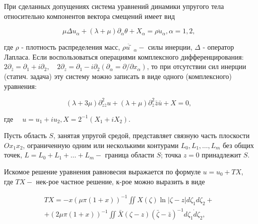 \documentclass[10pt]{article}
\begin{document}
При сделанных допущениях система уравнений динамики упругого тела относительно компонентов вектора смещений имеет вид



\[

\mu \Delta u_{\alpha}+(\lambda+\mu) \partial_{\alpha} \theta+X_{\alpha}=\rho \ddot{u}_{\alpha}, \alpha=1,2,

\]



где $\rho$ - плотность распределения масс, $\rho \ddot{u ̈}_{\alpha}-$ силы инерции, $\Delta$ - оператор Лапласа. Если воспользоваться операциями комплексного дифференцирования: $2 \partial_{\bar{z}}=\partial_{1}+i \partial_{2}, \quad 2 \partial_{z}=\partial_{1}-i \partial_{2}\left(\partial_{\alpha}=\partial / \partial x_{\alpha}\right)$, то при отсутствии сил инерции (статич. задача) эту систему можно записать в виде одного (комплексного) уравнения:



\[

(\lambda+3 \mu) \partial_{z \bar{z}}^{2} u+(\lambda+\mu) \partial_{\bar{z}}^{2} \bar{z} \bar{u}+X=0,

\]



где $\quad u=u_{1}+i u_{2}, X=2^{-1}\left(X_{1}+i X_{2}\right)$.



Пусть область $S$, занятая упругой средой, представляет связную часть плоскости $O x_{1} x_{2}$, ограниченную одним или несколькими контурами $L_{0}, L_{1}, \ldots, L_{m}$ без общих точек, $L=L_{0}+L_{1}+\ldots+L_{m}-$ граница области $S$; точка $z=0$ принадлежит $S$.



Искомое решение уравнения равновесия выражается по формуле $u=u_{0}+T X$, где $T X-$ нек-рое частное решение, к-рое можно выразить в виде



\[

\begin{gathered}

T X=-x(\mu \pi(1+x))^{-1} \iint X(\zeta) \ln |\zeta-z| d \zeta_{1} d \zeta_{2}+ \\

+(2 \mu \pi(1+x))^{-1} \iint \bar{X}(\zeta-z)(\bar{\zeta}-\bar{z})^{-1} d \zeta_{1} \dot{d} \zeta_{2},

\end{gathered}

\]
\end{document}
